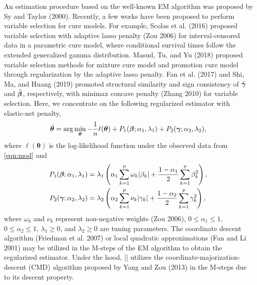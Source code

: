 An estimation procedure based on the well-known EM algorithm was
proposed by Sy and Taylor (2000). Recently, a few works have been
proposed to perform variable selection for cure models. For example,
Scolas et al. (2016) proposed variable selection with adaptive lasso
penalty (Zou 2006) for interval-censored data in a parametric cure
model, where conditional survival times follow the extended generalized
gamma distribution. Masud, Tu, and Yu (2018) proposed variable selection
methods for mixture cure model and promotion cure model through
regularization by the adaptive lasso penalty. Fan et al. (2017) and Shi,
Ma, and Huang (2019) promoted structural similarity and sign consistency
of \(\hat{\bm{\gamma}}\) and \(\hat{\bm{\beta}}\), respectively, with minimax concave
penalty (Zhang 2010) for variable selection. Here, we concentrate on the
following regularized estimator with elastic-net penalty, \begin{align}
  \hat{\bm{\theta}} = \arg\min_{\bm{\theta}} -\frac{1}{n}
  \ell(\bm{\theta})
  + P_{1}(\bm{\beta}; \alpha_1, \lambda_1) + P_{2}(\bm{\gamma}; \alpha_2, \lambda_2),
\end{align} where \(\ell(\bm{\theta})\) is the log-likelihood function
under the observed data from \eqref{eqn:mod} and \begin{align*}
  P_{1}(\bm{\beta}; \alpha_1, \lambda_1)
  & = \lambda_1 \left( \alpha_1 \sum_{k=1}^{p} \omega_k \lvert \beta_k \rvert +
  \frac{1 - \alpha_1}{2} \sum_{k=1}^{p} \beta_k^2\right),\\
  P_{2}(\bm{\gamma}; \alpha_2, \lambda_2)
  & = \lambda_2 \left( \alpha_2 \sum_{k=1}^{p} \nu_k \lvert \gamma_k \rvert +
  \frac{1 - \alpha_2}{2} \sum_{k=1}^{p} \gamma_k^2 \right),
\end{align*} where \(\omega_k\) and \(\nu_k\) represent non-negative
weights (Zou 2006), \(0\le\alpha_1\le1\), \(0\le\alpha_2\le1\),
\(\lambda_1\ge0\), and \(\lambda_2\ge0\) are tuning parameters. The
coordinate descent algorithm (Friedman et al. 2007) or local quadratic
approximations (Fan and Li 2001) may be utilized in the M-steps of the
EM algorithm to obtain the regularized estimator. Under the hood,
\VERB|\NormalTok{()}| utilizes the
coordinate-majorization-descent (CMD) algorithm proposed by Yang and Zou
(2013) in the M-steps due to its descent property.

